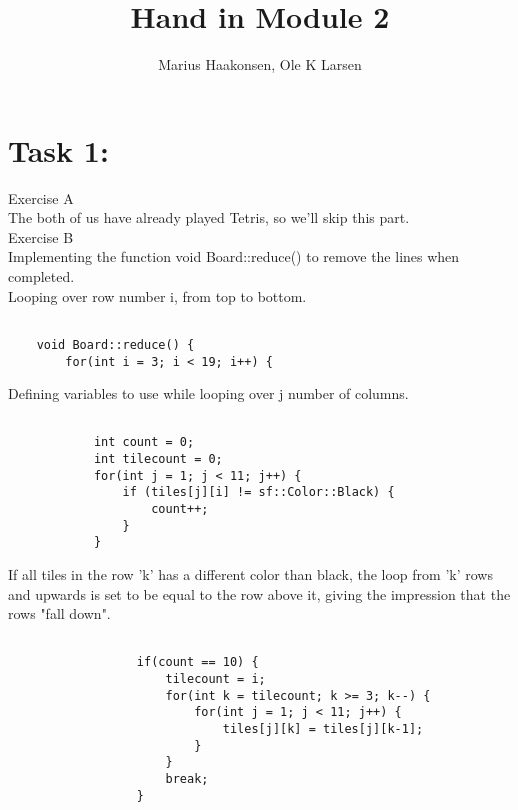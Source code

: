 \documentclass[11pt]{amsart}
\title{Hand in Module 2}
\author{Marius Haakonsen, Ole K Larsen}
\begin{document}
\maketitle

\section{Task 1:}

Exercise A  \\
The both of us have already played Tetris, so we'll skip this part.  \\

Exercise B \\

Implementing the function void Board::reduce() to remove the lines when completed. \\

Looping over row number i, from top to bottom. \\
\begin{verbatim}

	void Board::reduce() {
	    for(int i = 3; i < 19; i++) {

\end{verbatim}

Defining variables to use while looping over j number of columns. \\
\begin{verbatim}

	        int count = 0;
	        int tilecount = 0;
	        for(int j = 1; j < 11; j++) {
	            if (tiles[j][i] != sf::Color::Black) {
	                count++;
	            }
	        }

\end{verbatim}

If all tiles in the row 'k' has a different color than black, the loop from 'k' rows and upwards is set to be equal to the row above it, giving the impression that the rows "fall down". \\
\begin{verbatim}

	              if(count == 10) {
	                  tilecount = i;
	                  for(int k = tilecount; k >= 3; k--) {
	                      for(int j = 1; j < 11; j++) {
	                          tiles[j][k] = tiles[j][k-1];
	                      }
	                  }
	                  break;
	              }

\end{verbatim}
\end{document}
